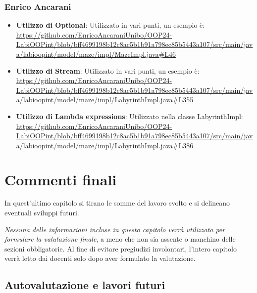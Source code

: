\documentclass[a4paper,12pt]{report}
\begin{document}
\subsection{Enrico Ancarani}
\begin{itemize}
	\item \textbf{Utilizzo di Optional}: Utilizzato in vari punti, un esempio è: \url{https://github.com/EnricoAncaraniUnibo/OOP24-LabiOOPint/blob/bff4699198b12c8ac5b1b91a798ec85b5443a107/src/main/java/labioopint/model/maze/impl/MazeImpl.java#L46}
	\item \textbf{Utilizzo di Stream}: Utilizzato in vari punti, un esempio è: \url{https://github.com/EnricoAncaraniUnibo/OOP24-LabiOOPint/blob/bff4699198b12c8ac5b1b91a798ec85b5443a107/src/main/java/labioopint/model/maze/impl/LabyrinthImpl.java#L355}
	\item \textbf{Utilizzo di Lambda expressions}: Utilizzato nella classe LabyrinthImpl: \url{https://github.com/EnricoAncaraniUnibo/OOP24-LabiOOPint/blob/bff4699198b12c8ac5b1b91a798ec85b5443a107/src/main/java/labioopint/model/maze/impl/LabyrinthImpl.java#L386}
\end{itemize}

\chapter{Commenti finali}

In quest'ultimo capitolo si tirano le somme del lavoro svolto e si delineano eventuali sviluppi
futuri.

\textit{Nessuna delle informazioni incluse in questo capitolo verrà utilizzata per formulare la valutazione finale}, a meno che non sia assente o manchino delle sezioni obbligatorie.
%
Al fine di evitare pregiudizi involontari, l'intero capitolo verrà letto dai docenti solo dopo aver formulato la valutazione.

\section{Autovalutazione e lavori futuri}
\end{document}
